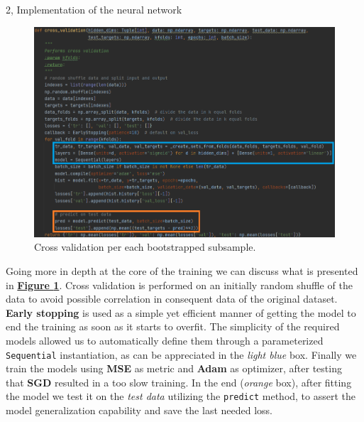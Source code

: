 \documentclass[10pt,a4paper]{article}
\begin{document}
\begin{task}{2, Implementation of the neural network}
\begin{figure}[h]
    \centering
    \includegraphics[scale=0.8]{images/nn_training.png}
    \caption{Cross validation per each bootstrapped subsample.}
    \label{fig:nn-training}
\end{figure}

Going more in depth at the core of the training we can discuss what is presented in \textbf{\hyperref[fig:nn-training]{Figure \ref{fig:nn-training}}}. Cross validation is performed on an initially random shuffle of the data to avoid possible correlation in consequent data of the original dataset. \textbf{Early stopping} is used as a simple yet efficient manner of getting the model to end the training as soon as it starts to overfit. The simplicity of the required models allowed us to automatically define them through a parameterized \texttt{Sequential} instantiation, as can be appreciated in the \textit{light blue} box. Finally we train the models using \textbf{MSE} as metric and \textbf{Adam} as optimizer, after testing that \textbf{SGD} resulted in a too slow training. In the end (\textit{orange} box), after fitting the model we test it on the \textit{test data} utilizing the \texttt{predict} method, to assert the model generalization capability and save the last needed loss.


\end{task}
\end{document}

